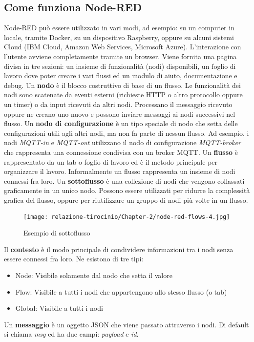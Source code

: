 \documentclass[a4paper,10pt]{memoir}
\begin{document}
\subsection{Come funziona Node-RED}
Node-RED può essere utilizzato in vari modi, ad esempio: su un computer in locale, tramite Docker, su un dispositivo Raspberry, oppure su alcuni sistemi Cloud (IBM Cloud, Amazon Web Services, Microsoft Azure).
L'interazione con l'utente avviene completamente tramite un browser. Viene fornita una pagina divisa in tre sezioni: un insieme di funzionalità (nodi) disponibili, un foglio di lavoro dove poter creare i vari flussi ed un modulo di aiuto, documentazione e debug.
Un \textbf{nodo} è il blocco costruttivo di base di un flusso. Le funzionalità dei nodi sono scatenate da eventi esterni (richieste HTTP o altro protocollo oppure un timer) o da input ricevuti da altri nodi. Processano il messaggio ricevuto oppure ne creano uno nuovo e possono inviare messaggi ai nodi successivi nel flusso. 
Un \textbf{nodo di configurazione} è un tipo speciale di nodo che setta delle configurazioni utili agli altri nodi, ma non fa parte di nessun flusso. Ad esempio, i nodi \textit{MQTT-in} e \textit{MQTT-out} utilizzano il nodo di configurazione \textit{MQTT-broker} che rappresenta una connessione condivisa con un broker MQTT.
Un \textbf{flusso} è rappresentato da un tab o foglio di lavoro ed è il metodo principale per organizzare il lavoro. Informalmente un flusso rappresenta un insieme di nodi connessi fra loro.
Un \textbf{sottoflusso} è una collezione di nodi che vengono collassati graficamente in un unico nodo. Possono essere utilizzati per ridurre la complessità grafica del flusso, oppure per riutilizzare un gruppo di nodi più volte in un flusso.
\begin{figure}[H]
\caption{Esempio di sottoflusso}
\label{fig:sottoflusso}
\texttt{[image: relazione-tirocinio/Chapter-2/node-red-flows-4.jpg]}
\end{figure}
Il \textbf{contesto} è il modo principale di condividere informazioni tra i nodi senza essere connessi fra loro. Ne esistono di tre tipi:
\begin{itemize}
    \item Node: Visibile solamente dal nodo che setta il valore
    \item Flow: Visibile a tutti i nodi che appartengono allo stesso flusso (o tab)
    \item Global: Visibile a tutti i nodi
\end{itemize}
Un \textbf{messaggio} è un oggetto JSON che viene passato attraverso i nodi. Di default si chiama \textit{msg} ed ha due campi: \textit{payload} e \textit{id}. 
\end{document}
